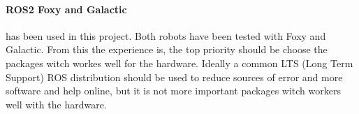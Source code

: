 \paragraph{ROS2 Foxy and Galactic} has been used in this project. Both robots have been tested with Foxy and Galactic. From this the experience is, the top priority should be choose the packages witch workes well for the hardware. Ideally a common LTS (Long Term Support) ROS distribution should be used to reduce sources of error and more software and help online, but it is not more important packages witch workers well with the hardware. 